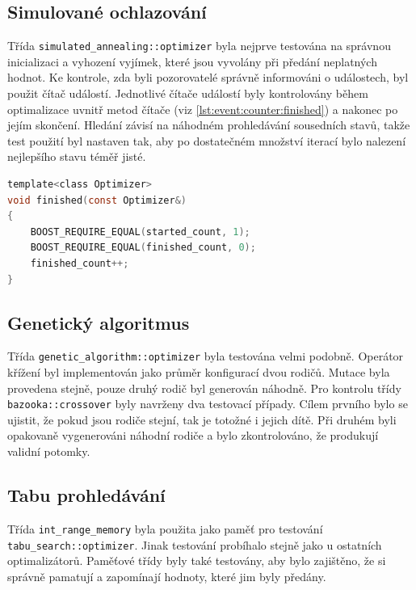 \subsection{Simulované ochlazování}
Třída \texttt{simulated\_annealing::optimizer} byla nejprve testována na správnou inicializaci a vyhození vyjímek, které jsou vyvolány při předání neplatných hodnot.
Ke kontrole, zda byli pozorovatelé správně informováni o událostech, byl použit čítač událostí.
Jednotlivé čítače událostí byly kontrolovány během optimalizace uvnitř metod čítače (viz \ref{lst:event:counter:finished}) a nakonec po jejím skončení.
Hledání závisí na náhodném prohledávání sousedních stavů, takže test použití byl nastaven tak, aby po dostatečném množství iterací bylo nalezení nejlepšího stavu téměř jisté.

\begin{lstlisting}[caption={~Kontrola hodnot čítače uvnitř metody \texttt{finished}},label={lst:event:counter:finished},captionpos=t,abovecaptionskip=-\medskipamount,belowcaptionskip=\medskipamount,language=C]
template<class Optimizer>
void finished(const Optimizer&)
{
    BOOST_REQUIRE_EQUAL(started_count, 1);
    BOOST_REQUIRE_EQUAL(finished_count, 0);
    finished_count++;
}
\end{lstlisting}

\subsection{Genetický algoritmus}
Třída \texttt{genetic\_algorithm::optimizer} byla testována velmi podobně.
Operátor křížení byl implementován jako průměr konfigurací dvou rodičů.
Mutace byla provedena stejně, pouze druhý rodič byl generován náhodně.
Pro kontrolu třídy \texttt{bazooka::crossover} byly navrženy dva testovací případy.
Cílem prvního bylo se ujistit, že pokud jsou rodiče stejní, tak je totožné i jejich dítě.
Při druhém byli opakovaně vygenerováni náhodní rodiče a bylo zkontrolováno, že produkují validní potomky.

\subsection{Tabu prohledávání}
Třída \texttt{int\_range\_memory} byla použita jako paměť pro testování \texttt{tabu\_search::optimizer}.
Jinak testování probíhalo stejně jako u ostatních optimalizátorů.
Paměťové třídy byly také testovány, aby bylo zajištěno, že si správně pamatují a zapomínají hodnoty, které jim byly předány.

